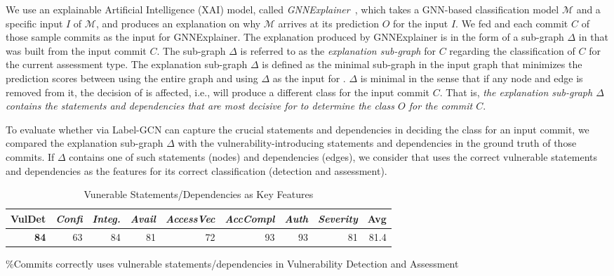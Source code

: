 We use an explainable Artificial Intelligence (XAI) model,
called {\em GNNExplainer}~\cite{GNNExplainer}, which takes a GNN-based
classification model $\mathcal{M}$ and a specific input $I$ of
$\mathcal{M}$, and produces an explanation on why $\mathcal{M}$
arrives at its prediction $O$ for the input $I$.
%
We fed {\tool} and each commit $C$ of those sample commits as the
input for GNNExplainer. The explanation produced by GNNExplainer is in
the form of a sub-graph $\Delta$ in {\mvpdg} that was built from the
input commit $C$. The sub-graph $\Delta$ is referred to as the {\em
explanation sub-graph} for $C$ regarding the classification of $C$ for
the current assessment type. The explanation sub-graph $\Delta$ is
defined as the minimal sub-graph in the input graph {\mvpdg} that
minimizes the prediction scores between using the entire graph
{\mvpdg} and using $\Delta$ as the input for {\tool}. $\Delta$ is
minimal in the sense that if any node and edge is removed from it, the
decision of {\tool} is affected, i.e., {\tool} will produce a
different class for the input commit $C$. That is, {\em the
explanation sub-graph $\Delta$ contains the statements and
dependencies that are most decisive for {\tool} to determine the class
$O$ for the commit $C$}.

To evaluate whether {\tool} via Label-GCN can capture the crucial
statements and dependencies in deciding the class for an input commit,
we compared the explanation sub-graph $\Delta$ with the
vulnerability-introducing statements and dependencies in the ground
truth of those commits. If $\Delta$ contains one of such statements
(nodes) and dependencies (edges), we consider that {\tool} uses the
correct vulnerable statements and dependencies as the features for its
correct classification (detection and assessment).


\begin{table}[t]
\caption{Vunerable Statements/Dependencies as Key Features}
	\vspace{-12pt}
	\tabcolsep 2.1pt
\small
	\begin{center}
\begin{tabular}{|r||r|r|r|r|r|r|r||r|}
  \hline
    {\bf VulDet} & {\em Confi} & {\em Integ.} & {\em Avail} & {\em AccessVec} & {\em AccCompl} & {\em Auth} & {\em Severity} & {\bf Avg} \\
  \hline
  {\bf 84} & 63 & 84 & 81 & 72 & 93 & 93 & 81 & 81.4 \\
  \hline
\end{tabular}
\label{gnn}
\%Commits {\tool} correctly uses vulnerable statements/dependencies in Vulnerability Detection and Assessment
\end{center}
\vspace{-12pt}
\end{table}

